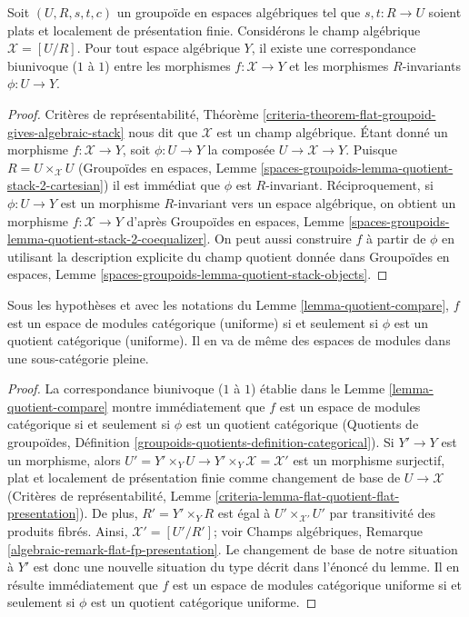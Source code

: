 \begin{lemma}
\label{lemma-quotient-compare}
Soit $(U, R, s, t, c)$ un groupoïde en espaces algébriques tel que
$s, t : R \to U$ soient plats et localement de présentation finie.
Considérons le champ algébrique $\mathcal{X} = [U/R]$.
Pour tout espace algébrique $Y$, il existe une correspondance biunivoque ($1$ à $1$) entre les
morphismes $f : \mathcal{X} \to Y$ et les morphismes $R$-invariants
$\phi : U \to Y$.
\end{lemma}

\begin{proof}
Critères de représentabilité, Théorème
\ref{criteria-theorem-flat-groupoid-gives-algebraic-stack}
nous dit que $\mathcal{X}$ est un champ algébrique.
Étant donné un morphisme $f : \mathcal{X} \to Y$, soit $\phi : U \to Y$
la composée $U \to \mathcal{X} \to Y$. Puisque $R = U \times_\mathcal{X} U$
(Groupoïdes en espaces, Lemme
\ref{spaces-groupoids-lemma-quotient-stack-2-cartesian})
il est immédiat que $\phi$ est $R$-invariant.
Réciproquement, si $\phi : U \to Y$ est un morphisme $R$-invariant vers
un espace algébrique, on obtient un morphisme
$f : \mathcal{X} \to Y$ d'après
Groupoïdes en espaces, Lemme
\ref{spaces-groupoids-lemma-quotient-stack-2-coequalizer}.
On peut aussi construire $f$ à partir de $\phi$ en utilisant la description explicite du
champ quotient donnée dans
Groupoïdes en espaces, Lemme
\ref{spaces-groupoids-lemma-quotient-stack-objects}.
\end{proof}

\begin{lemma}
\label{lemma-categorical-quotient-compare}
Sous les hypothèses et avec les notations du Lemme \ref{lemma-quotient-compare},
$f$ est un espace de modules catégorique (uniforme)
si et seulement si $\phi$ est un quotient catégorique (uniforme).
Il en va de même des espaces de modules dans une sous-catégorie pleine.
\end{lemma}

\begin{proof}
La correspondance biunivoque ($1$ à $1$) établie dans le
Lemme \ref{lemma-quotient-compare} montre immédiatement que $f$ est un espace de modules catégorique
si et seulement si $\phi$ est un quotient catégorique
(Quotients de groupoïdes, Définition
\ref{groupoids-quotients-definition-categorical}).
Si $Y' \to Y$ est un morphisme, alors
$U' = Y' \times_Y U \to Y' \times_Y \mathcal{X} = \mathcal{X}'$
est un morphisme surjectif, plat et localement de présentation finie
comme changement de base de $U \to \mathcal{X}$
(Critères de représentabilité, Lemme
\ref{criteria-lemma-flat-quotient-flat-presentation}).
De plus, $R' = Y' \times_Y R$ est égal à $U' \times_{\mathcal{X}'} U'$
par transitivité des produits fibrés.
Ainsi, $\mathcal{X}' = [U'/R']$; voir
Champs algébriques, Remarque \ref{algebraic-remark-flat-fp-presentation}.
Le changement de base de notre situation à $Y'$ est donc une nouvelle situation
du type décrit dans l'énoncé du lemme. Il en
résulte immédiatement que $f$ est un espace de modules catégorique uniforme
si et seulement si $\phi$ est un quotient catégorique uniforme.
\end{proof}

